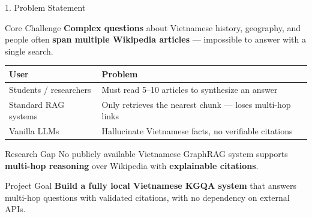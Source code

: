 \documentclass[aspectratio=169]{beamer}
\begin{document}
\begin{frame}[shrink=12]{1. Problem Statement}
\begin{alertblock}{Core Challenge}
{\small\textbf{Complex questions} about Vietnamese history, geography, and people often \textbf{span multiple Wikipedia articles} --- impossible to answer with a single search.}
\end{alertblock}
\vspace{0.15em}
\begin{center}
\small
\begin{tabular}{l>{\raggedright\arraybackslash}p{6.8cm}}
\toprule
\textbf{User} & \textbf{Problem} \\
\midrule
Students / researchers & Must read 5--10 articles to synthesize an answer \\
Standard RAG systems & Only retrieves the nearest chunk --- loses multi-hop links \\
Vanilla LLMs & Hallucinate Vietnamese facts, no verifiable citations \\
\bottomrule
\end{tabular}
\end{center}
\vspace{0.15em}
\begin{exampleblock}{Research Gap}
{\small No publicly available Vietnamese GraphRAG system supports \textbf{multi-hop reasoning} over Wikipedia with \textbf{explainable citations}.}
\end{exampleblock}
\vspace{0.1em}
\begin{block}{Project Goal}
{\small\textbf{Build a fully local Vietnamese KGQA system} that answers multi-hop questions with validated citations, with no dependency on external APIs.}
\end{block}
\end{frame}
\end{document}
